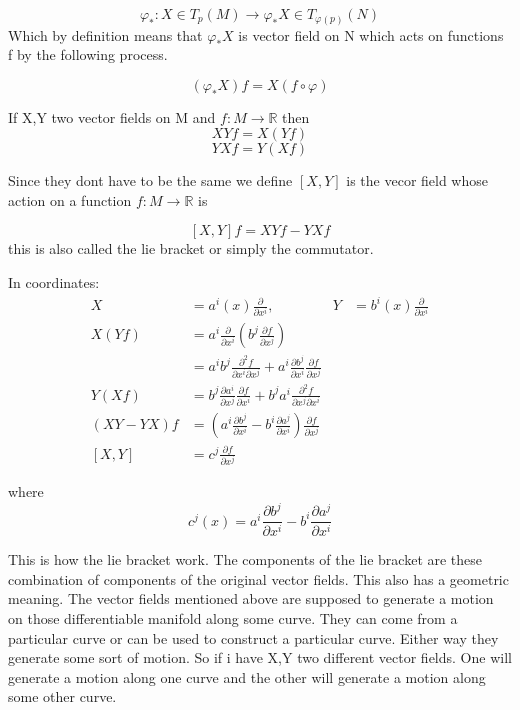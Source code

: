 \documentclass{article}
\begin{document}
\[ \varphi_{*} : X \in T_{p}(M) \to \varphi_{*}X \in T_{\varphi(p)}(N) \] 
Which by definition means that \( \varphi_{*}X \) is vector field on N which acts on functions f by the following process. 

\[ (\varphi_{*}X)f = X(f\circ \varphi) \]

\begin{theorem}
    If X,Y two vector fields on M and \( f : M \to \mathbb{R} \) then 
    \[ XYf = X(Yf) \]
    \[ YXf = Y(Xf) \] 

    Since they dont have to be the same we define \( [X,Y] \) is the vecor field whose action on a function \( f:M \to \mathbb{R} \) is 

    \[ [X,Y]f  = XYf - YXf \]
    this is also called the lie bracket or simply the commutator. 
\end{theorem}

In coordinates:
\begin{align*}
X &= a^i(x) \frac{\partial}{\partial x^i}, & Y &= b^i(x) \frac{\partial}{\partial x^i} \\
X(Yf) &= a^i \frac{\partial}{\partial x^i} \left( b^j \frac{\partial f}{\partial x^j} \right) \\
      &= a^i b^j \frac{\partial^2 f}{\partial x^i \partial x^j} + a^i \frac{\partial b^j}{\partial x^i} \frac{\partial f}{\partial x^j} \\
Y(Xf) &= b^j \frac{\partial a^i}{\partial x^j} \frac{\partial f}{\partial x^i} + b^j a^i \frac{\partial^2 f}{\partial x^j \partial x^i} \\
(XY - YX)f &= \left( a^i \frac{\partial b^j}{\partial x^i} - b^i \frac{\partial a^j}{\partial x^i} \right) \frac{\partial f}{\partial x^j} \\
[X,Y] &=c^{j}\frac{\partial f}{\partial x^j} 
\end{align*}

where \[ c^j (x) = a^i \frac{\partial b^j}{\partial x^i} - b^i \frac{\partial a^j}{\partial x^i} \]

This is how the lie bracket work. The components of the lie bracket are these combination of components of the original vector fields. This also has a geometric meaning. The vector fields mentioned above are supposed to generate a motion on those differentiable manifold along some curve. They can come from a particular curve or can be used to construct a particular curve. Either way they generate some sort of motion. So if i have X,Y two different vector fields. One will generate a motion along one curve and the other will generate a motion along some other curve. 
\end{document}
